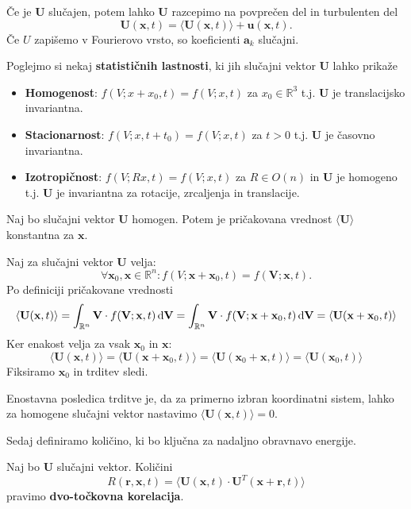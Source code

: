 \documentclass[mat2, tisk]{fmfdelo}
\newcommand{\R}{\mathbb R}
\newcommand{\bd}{\textbf}
\begin{document}
Če je $\bd{U}$ slučajen, potem lahko $\bd{U}$ razcepimo na 
povprečen del in turbulenten del 
\begin{equation}
\label{Reynoldsov razcep}
\bd{U}(\bd{x}, t) = \langle \bd{U}(\bd{x}, t) \rangle + \bd{u}(\bd{x}, t).
\end{equation}
Če $U$ zapišemo v Fourierovo vrsto, so koeficienti $\bd{a}_k$ slučajni.

Poglejmo si nekaj \textbf{statističnih lastnosti}, ki jih slučajni 
vektor $\bd{U}$ lahko prikaže
\begin{itemize}
  \item \textbf{Homogenost}: $f(V; x + x_0, t) = f(V; x, t)$ za $x_0 \in \R^3$ t.j. $\bd{U}$ je 
  translacijsko invariantna.
  \item \textbf{Stacionarnost}: $f(V; x, t + t_0) = f(V; x, t)$ za $t>0$ t.j. $\bd{U}$ je 
  časovno invariantna. 
  \item \textbf{Izotropičnost}: $f(V; Rx, t) = f(V; x, t)$ za $R\in O(n)$ in $\bd{U}$ je homogeno t.j. $\bd{U}$ je 
  invariantna za rotacije, zrcaljenja in translacije. 
\end{itemize} 

\begin{lema}
\label{homogenost}
Naj bo slučajni vektor $\bd{U}$ homogen. Potem je pričakovana 
vrednost $\langle \bd{U} \rangle$ konstantna za $\bd{x}$. 
\end{lema}

\begin{dokaz}
Naj za slučajni vektor $\bd{U}$ velja:
$$\forall \bd{x}_0, \bd{x} \in \R^n: f(V; \bd{x} + \bd{x}_0, t) = f(\bd{V}; \bd{x}, t).$$
Po definiciji pričakovane vrednosti
$$
\langle \bd{U}(\bd{x}, t) \rangle = \int_{\R^n} \bd{V} \cdot f(\bd{V}; \bd{x}, t) \dif \bd{V} = \int_{\R^n} \bd{V} \cdot f(\bd{V}; \bd{x} + \bd{x}_0, t) \dif \bd{V} = \langle \bd{U}(\bd{x} + \bd{x}_0, t) \rangle
$$
Ker enakost velja za vsak $\bd{x}_0$ in $\bd{x}$: 
$$
\langle \bd{U}(\bd{x}, t) \rangle = \langle \bd{U}(\bd{x} + \bd{x}_0, t) \rangle = \langle \bd{U}(\bd{x}_0 + \bd{x}, t) \rangle = \langle \bd{U}(\bd{x}_0, t) \rangle
$$
Fiksiramo $\bd{x}_0$ in trditev sledi.
\end{dokaz}
\noindent
Enostavna posledica trditve je, da za primerno izbran koordinatni sistem,
lahko za homogene slučajni vektor nastavimo $\langle \bd{U}(\bd{x}, t) \rangle = 0$.

Sedaj definiramo količino, ki bo ključna za nadaljno obravnavo 
energije.

\begin{definicija}
Naj bo $\bd{U}$ slučajni vektor. Količini 
\begin{equation}
R(\bd{r}, \bd{x}, t) = \langle \bd{U}(\bd{x}, t)\cdot \bd{U}^T(\bd{x} + \bd{r}, t)\rangle
\end{equation}
pravimo \textbf{dvo-točkovna korelacija}.
\end{definicija}
\end{document}

